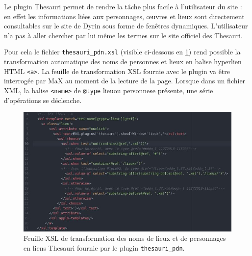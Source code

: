 \documentclass[a4paper,12pt,twoside]{book}
\begin{document}
Le plugin Thesauri permet de rendre la tâche plus facile à l'utilisateur du site : en effet les informations liées aux personnages, \oe{}uvres et lieux sont directement consultables sur le site de Dyrin sous forme de fenêtres dynamiques. L'utilisateur n'a pas à aller chercher par lui même les termes sur le site officiel des Thesauri.


Pour cela le fichier \texttt{thesauri\_pdn.xsl} (visible ci-dessous en \ref{lieux_xsl}) rend possible la transformation automatique des noms de personnes et lieux en balise hyperlien \acrshort{HTML} \texttt{<a>}. La feuille de transformation \acrshort{XSL} fournie avec le plugin  va être interrogée par MaX au moment de la lecture de la page. Lorsque dans un fichier XML, la balise \texttt{<name>} de \texttt{@type} \og lieu\fg ou \og personne\fg se présente, une série d'opérations se déclenche.

\begin{figure}[H]
    \centering
    \includegraphics[width=12cm]{img/partie_3/lieux_xsl.JPG}
    \caption{Feuille \acrshort{XSL} de transformation des noms de lieux et de personnages en liens Thesauri fournie par le plugin \texttt{thesauri\_pdn}.}
    \label{lieux_xsl}
\end{figure}
\end{document}
